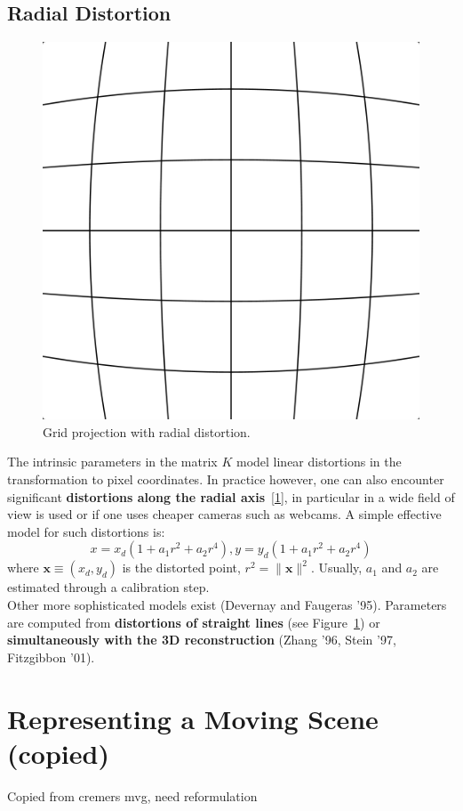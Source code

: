 \subsection{Radial Distortion}%
\label{sub:radial_distortion}


\begin{figure}[h]
\centering
\includegraphics[width=0.5\columnwidth]{assets/img/barrel_distortion.png}
\caption{Grid projection with radial distortion.}%
\label{fig:radial_distortion}
\end{figure}

The intrinsic parameters in the matrix $K$ model linear distortions
in the transformation to pixel coordinates.
In practice however, one can also encounter significant
\textbf{distortions along the radial axis}~[\ref{fig:radial_distortion}],
in particular in a wide field of view is used or if one uses cheaper cameras
such as webcams.
A simple effective model for such distortions is:
\[
	x = x_d ( 1 + a_1 r^2 + a_2 r^4 ),
	y = y_d ( 1 + a_1 r^2 + a_2 r^4 )
\]
where $\bm{x} \equiv (x_d, y_d)$ is the distorted point,
$r^2 = \|\bm{x}\|^2$.
Usually, $a_1$ and $a_2$ are estimated through a calibration step.\\

Other more sophisticated models exist (Devernay and Faugeras '95).
Parameters are computed from
\textbf{distortions of straight lines} (see Figure~\ref{fig:radial_distortion})
or \textbf{simultaneously with the 3D reconstruction}
(Zhang '96, Stein '97, Fitzgibbon '01).

\section{Representing a Moving Scene (copied)}%
\label{sec:moving-scene}

\alert{Copied from cremers mvg, need reformulation}

